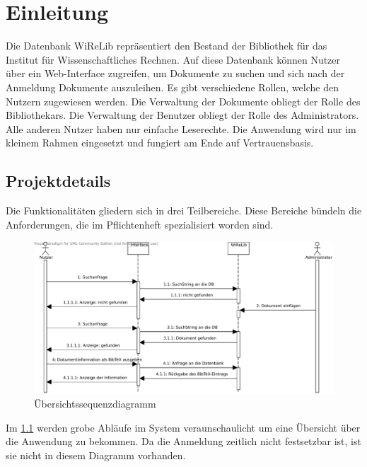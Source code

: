
\chapter{Einleitung}
Die Datenbank WiReLib repräsentiert den Bestand der Bibliothek für das Institut für Wissenschaftliches Rechnen.
Auf diese Datenbank können Nutzer über ein Web-Interface zugreifen, um Dokumente zu suchen und sich nach der Anmeldung Dokumente auszuleihen.
Es gibt verschiedene Rollen, welche den Nutzern zugewiesen werden.
Die Verwaltung der Dokumente obliegt der Rolle des Bibliothekars.
Die Verwaltung der Benutzer obliegt der Rolle des Administrators.
Alle anderen Nutzer haben nur einfache Leserechte.
Die Anwendung wird nur im kleinem Rahmen eingesetzt und fungiert am Ende auf
Vertrauensbasis.

\section{Projektdetails}
Die Funktionalitäten gliedern sich in drei Teilbereiche.
Diese Bereiche bündeln die Anforderungen, die im Pflichtenheft spezialisiert
worden sind.

\begin{figure}[h]
\begin{center}
\includegraphics[width=0.9\linewidth]{bilder/Seq-Uebersicht.pdf}
\caption[Übersichtssequenzdiagramm]{Übersichtssequenzdiagramm}
\label{Seq-Übersicht}
\end{center}
\end{figure}

Im \ref{Seq-Übersicht}  werden grobe Abläufe im System 
veraunschaulicht um eine Übersicht über die Anwendung zu bekommen.
Da die Anmeldung zeitlich nicht festsetzbar ist, ist sie nicht in diesem
Diagramm vorhanden.

